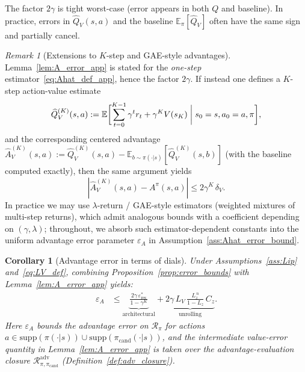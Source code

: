 \documentclass{article}
\theoremstyle{plain}
\newtheorem{corollary}[theorem]{Corollary}
\theoremstyle{definition}
\theoremstyle{remark}
\newtheorem{remark}[theorem]{Remark}
\newcommand{\E}{\mathbb{E}}
\begin{document}
The factor $2\gamma$ is tight worst-case (error appears in both $Q$ and baseline).
In practice, errors in $\widehat Q_V(s,a)$ and the baseline $\E_\pi[\widehat Q_V]$ often have the same sign and partially cancel.
\begin{remark}[Extensions to $K$-step and GAE-style advantages]
\label{rem:A_error_kstep_app}
Lemma~\ref{lem:A_error_app} is stated for the \emph{one-step} estimator~\eqref{eq:Ahat_def_app}, hence the factor $2\gamma$.
If instead one defines a $K$-step action-value estimate
\begin{equation*}
\widehat Q_V^{(K)}(s,a) :=
\E\biggl[\sum_{t=0}^{K-1}\gamma^t r_t + \gamma^K V(s_K) \biggm| s_0=s, a_0=a, \pi\biggr],
\end{equation*}
and the corresponding centered advantage
$\widehat A_V^{(K)}(s,a):=\widehat Q_V^{(K)}(s,a)-\E_{b\sim\pi(\cdot|s)}[\widehat Q_V^{(K)}(s,b)]$
(with the baseline computed exactly), then the same argument yields
\[
|\widehat A_V^{(K)}(s,a)-A^\pi(s,a)| \le 2\gamma^K\,\delta_V.
\]
In practice we may use $\lambda$-return / GAE-style estimators (weighted mixtures of multi-step returns), which admit analogous bounds with a coefficient depending on $(\gamma,\lambda)$; throughout, we absorb such estimator-dependent constants into the uniform advantage error parameter $\varepsilon_A$ in Assumption~\ref{ass:Ahat_error_bound}.
\end{remark}

\begin{corollary}[Advantage error in terms of dials]
\label{cor:epsA_dials_app}
Under Assumptions~\ref{ass:Lip} and~\eqref{eq:LV_def}, combining Proposition~\ref{prop:error_bounds} with Lemma~\ref{lem:A_error_app} yields:
\begin{align}
\varepsilon_A
&\le
\underbrace{\frac{2\gamma\,\varepsilon_{\mathrm{res}}^*}{1-\gamma^K}}_{\text{architectural}}
+
\underbrace{2\gamma\,L_V\,\frac{L_z^{\,n}}{1-L_z}\,C_z}_{\text{unrolling}}.
\label{eq:epsA_dials_app}
\end{align}
Here $\varepsilon_A$ bounds the advantage error on $\mathcal{R}_\pi$ for actions
$a\in \mathrm{supp}(\pi(\cdot|s))\cup\mathrm{supp}(\pi_{\mathrm{cand}}(\cdot|s))$,
and the intermediate value-error quantity in Lemma~\ref{lem:A_error_app} is taken over the advantage-evaluation closure $\mathcal{R}_{\pi,\pi_{\mathrm{cand}}}^{\mathrm{adv}}$ (Definition~\ref{def:adv_closure}).
\end{corollary}
\end{document}
